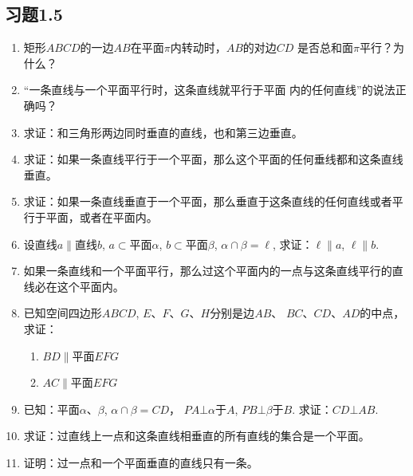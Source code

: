\subsection*{习题1.5}
\begin{enumerate}
  \item 矩形$ABCD$的一边$AB$在平面$\pi$内转动时，$AB$的对边$CD$
  是否总和面$\pi$平行？为什么？
  \item “一条直线与一个平面平行时，这条直线就平行于平面
  内的任何直线”的说法正确吗？
  \item 求证：和三角形两边同时垂直的直线，也和第三边垂直。
  \item 求证：如果一条直线平行于一个平面，那么这个平面的任何垂线都和这条直线垂直。
  \item 求证：如果一条直线垂直于一个平面，那么垂直于这条直线的任何直线或者平行于平面，或者在平面内。
  \item 设直线$a\parallel$直线$b$, $a\subset$平面$\alpha$, $b\subset$平面$\beta$, $\alpha\cap\beta=\ell$, 求证：$\ell\parallel a$, $\ell\parallel b$.
  \item 如果一条直线和一个平面平行，那么过这个平面内的一点与这条直线平行的直线必在这个平面内。
  \item 已知空间四边形$ABCD$, $E$、$F$、$G$、$H$分别是边$AB$、
  $BC$、$CD$、$AD$的中点，求证：
\begin{enumerate}
  \item $BD\parallel$平面$EFG$
  \item $AC\parallel $平面$EFG$
\end{enumerate}

\item 已知：平面$\alpha$、$\beta$, $\alpha\cap\beta=CD$，
$PA\bot\alpha$于$A$, $PB\bot\beta$于$B$. 求证：$CD\bot AB$.
\item 求证：过直线上一点和这条直线相垂直的所有直线的集合是一个平面。
\item 证明：过一点和一个平面垂直的直线只有一条。

\begin{figure}[htp]
  \centering
  \begin{minipage}[t]{0.48\textwidth}
  \centering
\end{minipage}
\end{figure}
\end{enumerate}
